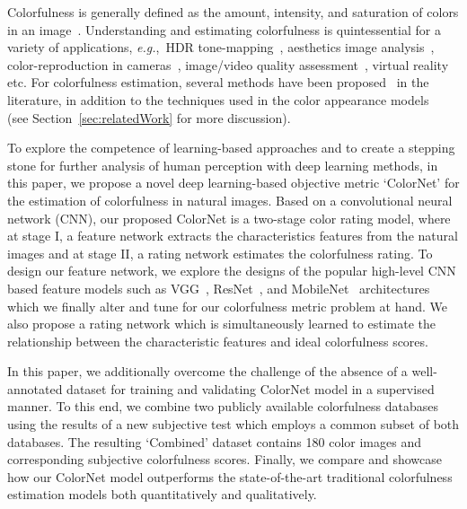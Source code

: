 \documentclass{article}
\newcommand{\eg}[0]{\textit{e.g.},~}
\begin{document}
Colorfulness is generally defined as the amount, intensity, and saturation of colors in an image~\cite{fairchild2013color}. Understanding and estimating colorfulness is quintessential for a variety of applications, \eg HDR tone-mapping~\cite{mantiuk2009color, reinhard2012calibrated, rana2019learning, rana-icme17, rana-icip17}, aesthetics image analysis~\cite{datta2006studying, aydin2015automated}, color-reproduction in cameras~\cite{Karaimer_CVPR},
image/video quality assessment~\cite{winkler2012analysis, pinson2013selecting,yendrikhovskij1998optimizing, panetta2013no}, virtual reality~\cite{rana-icassp} etc. For colorfulness estimation, several methods have been proposed~\cite{yendrikhovskij1998optimizing, hasler2003measuring, datta2006studying, panetta2013no, amati2014study} in the literature, in addition to the techniques used in the color appearance models~\cite{hunt1995reproduction, nayatani1995revision, fairchild2013color} (see Section~\ref{sec:relatedWork} for more discussion).  




To explore the competence of learning-based approaches and to create a stepping stone for further analysis of human perception with deep learning methods, in this paper, we propose a novel deep learning-based objective metric `ColorNet' for the estimation of colorfulness in natural images. 
Based on a convolutional neural network (CNN), our proposed ColorNet is a two-stage color rating model, where at stage I, a feature network extracts the characteristics features from the natural images and at stage II, a rating network estimates the colorfulness rating. To design our feature network, we explore the designs of the popular high-level CNN based feature models such as VGG~\cite{Simonyan15}, ResNet~\cite{He2016DeepRL}, and MobileNet~\cite{MobileNetsEC} architectures which we finally alter and tune for our colorfulness metric problem at hand. We also propose a rating network which is simultaneously learned to estimate the relationship between the characteristic features and ideal colorfulness scores.  

In this paper, we additionally overcome the challenge of the absence of a well-annotated dataset for training and validating ColorNet model in a supervised manner. To this end, we combine two publicly available colorfulness databases~\cite{hasler2003measuring,amati2014study} using the results of a new subjective test which employs a common subset of both databases. The resulting `Combined' dataset contains 180 color images and corresponding subjective colorfulness scores. Finally, we compare and showcase how our ColorNet model outperforms the state-of-the-art traditional colorfulness estimation models both quantitatively and qualitatively.
\end{document}
